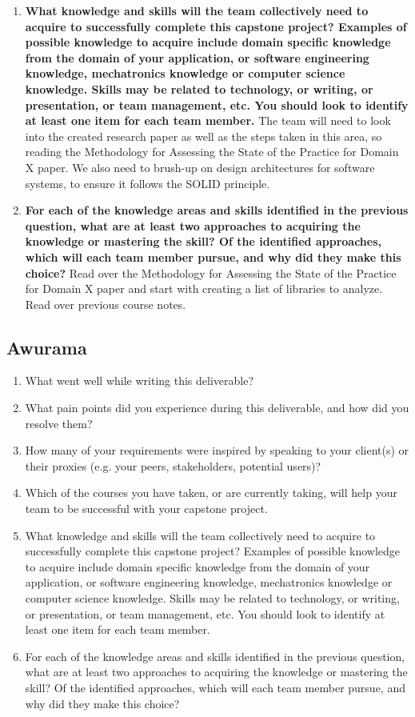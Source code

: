 \begin{enumerate}
  \item \textbf{What knowledge and skills will the team collectively need to acquire to
  successfully complete this capstone project?  Examples of possible knowledge
  to acquire include domain specific knowledge from the domain of your
  application, or software engineering knowledge, mechatronics knowledge or
  computer science knowledge.  Skills may be related to technology, or writing,
  or presentation, or team management, etc.  You should look to identify at
  least one item for each team member.}
  The team will need to look into the created research paper as well as the steps taken in this area, so reading the Methodology for Assessing the State of the Practice for Domain X paper. We also need to brush-up on design architectures for software systems, to ensure it follows the SOLID principle. 
  \item \textbf{For each of the knowledge areas and skills identified in the previous
  question, what are at least two approaches to acquiring the knowledge or
  mastering the skill?  Of the identified approaches, which will each team
  member pursue, and why did they make this choice?}
  Read over the Methodology for Assessing the State of the Practice for Domain X paper and start with creating a list of libraries to analyze. Read over previous course notes.
\end{enumerate}
\subsection*{Awurama}

\begin{enumerate}
  \item What went well while writing this deliverable? 
  \item What pain points did you experience during this deliverable, and how did
  you resolve them?
  \item How many of your requirements were inspired by speaking to your
  client(s) or their proxies (e.g. your peers, stakeholders, potential users)?
  \item Which of the courses you have taken, or are currently taking, will help
  your team to be successful with your capstone project.
  \item What knowledge and skills will the team collectively need to acquire to
  successfully complete this capstone project?  Examples of possible knowledge
  to acquire include domain specific knowledge from the domain of your
  application, or software engineering knowledge, mechatronics knowledge or
  computer science knowledge.  Skills may be related to technology, or writing,
  or presentation, or team management, etc.  You should look to identify at
  least one item for each team member.
  \item For each of the knowledge areas and skills identified in the previous
  question, what are at least two approaches to acquiring the knowledge or
  mastering the skill?  Of the identified approaches, which will each team
  member pursue, and why did they make this choice?
\end{enumerate}
